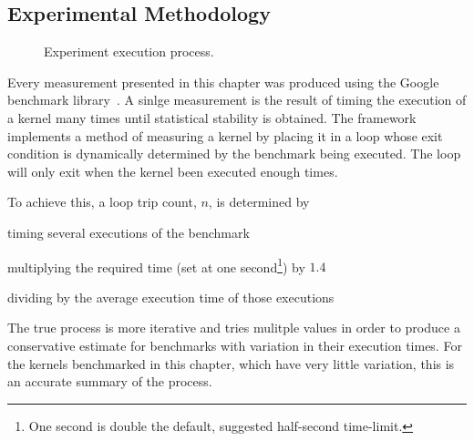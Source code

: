 \documentclass[\main/thesis.tex]{subfiles}
\begin{document}
\subsection{Experimental Methodology}
\begin{figure}[t]
  \centering
  \caption{Experiment execution process.}
  \label{fig:execution}
\end{figure}

Every measurement presented in this chapter was produced using the Google\texttrademark{} benchmark library\footnotemark~\autocite{googlebench}.
A sinlge measurement is the result of timing the execution of a kernel many times until statistical stability is obtained.
The framework implements a method of measuring a kernel by placing it in a loop whose exit condition is dynamically determined by the benchmark being executed.
The loop will only exit when the kernel been executed enough times.

To achieve this, a loop trip count, $n$, is determined by
\begin{enumerate*}[itemjoin={{; }}, itemjoin*={{; and }}, label=(\arabic*), after={\footnotemark.}]
  \item timing several executions of the benchmark
  \item multiplying the required time (set at one second\footnote{One second is double the default, suggested half-second time-limit.}) by $1.4$
  \item dividing by the average execution time of those executions
\end{enumerate*}
The true process is more iterative and tries mulitple values in order to produce a conservative estimate for benchmarks with variation in their execution times.
For the kernels benchmarked in this chapter, which have very little variation, this is an accurate summary of the process.
\end{document}

